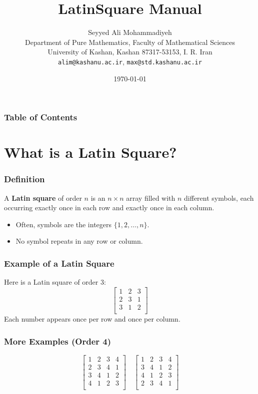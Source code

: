 \documentclass{beamer}
\title{LatinSquare Manual}
\author[S. A. Mohammadiyeh]{Seyyed Ali Mohammadiyeh\\
Department of Pure Mathematics, Faculty of Mathematical Sciences\\
University of Kashan, Kashan 87317-53153, I. R. Iran\\
\texttt{alim@kashanu.ac.ir}, \texttt{max@std.kashanu.ac.ir}}
\date{\today}
\begin{document}
\begin{frame}
  \titlepage
\end{frame}

\begin{frame}
  \frametitle{Table of Contents}
  \tableofcontents
\end{frame}

\section{What is a Latin Square?}

\begin{frame}
\frametitle{Definition}
A \textbf{Latin square} of order $n$ is an $n \times n$ array filled with $n$ different symbols, each occurring exactly once in each row and exactly once in each column.
\pause
\begin{itemize}
  \item Often, symbols are the integers $\{1, 2, \dots, n\}$.
  \item No symbol repeats in any row or column.
\end{itemize}
\end{frame}

\begin{frame}
\frametitle{Example of a Latin Square}
Here is a Latin square of order 3:
\[
\begin{bmatrix}
1 & 2 & 3 \\
2 & 3 & 1 \\
3 & 1 & 2 \\
\end{bmatrix}
\]
\pause
Each number appears once per row and once per column.
\end{frame}

\begin{frame}
\frametitle{More Examples (Order 4)}
\[
\begin{bmatrix}
1 & 2 & 3 & 4 \\
2 & 3 & 4 & 1 \\
3 & 4 & 1 & 2 \\
4 & 1 & 2 & 3 \\
\end{bmatrix}
\quad
\begin{bmatrix}
1 & 2 & 3 & 4 \\
3 & 4 & 1 & 2 \\
4 & 1 & 2 & 3 \\
2 & 3 & 4 & 1 \\
\end{bmatrix}
\]
\end{frame}
\end{document}
